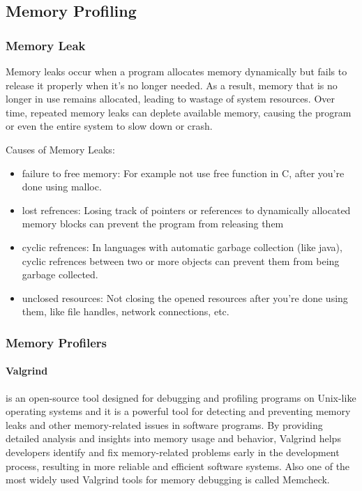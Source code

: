 \documentclass{article}
\begin{document}
	\subsection{Memory Profiling}
	\subsubsection{Memory Leak}
	Memory leaks occur when a program allocates memory dynamically but fails to release it properly when it's no longer needed.
	As a result, memory that is no longer in use remains allocated, leading to wastage of system resources.
	Over time, repeated memory leaks can deplete available memory, causing the program or even the entire system to slow down or crash.
	
	Causes of Memory Leaks:
	\begin{itemize}
		\item failure to free memory: For example not use free function in C, after you're done using malloc.

		\item lost refrences: Losing track of pointers or references to dynamically allocated memory blocks can prevent the program from releasing them

		\item cyclic refrences: In languages with automatic garbage collection (like java), cyclic refrences between two or more objects can prevent them from being garbage collected.

		\item unclosed resources: Not closing the opened resources after you're done using them, like file handles, network connections, etc.
	\end{itemize}

	\subsubsection{Memory Profilers}
	\paragraph{Valgrind} is an open-source tool designed for debugging and profiling programs on Unix-like operating systems and it is a powerful tool for detecting and preventing memory leaks and other memory-related issues in software programs.
	By providing detailed analysis and insights into memory usage and behavior, Valgrind helps developers identify and fix memory-related problems early in the development process, resulting in more reliable and efficient software systems.
	Also one of the most widely used Valgrind tools for memory debugging is called Memcheck.
\end{document}
